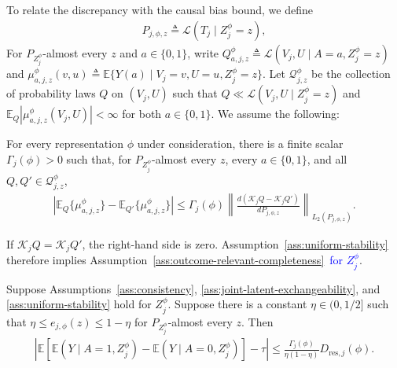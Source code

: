 To relate the discrepancy with the causal bias bound, we define
\begin{align}
	P_{j,\phi,z}\triangleq\mathcal L(T_j\mid Z_j^\phi=z),
	\label{eq:reference-held-out-law}
\end{align}
For $P_{Z_j^\phi}$-almost every $z$ and $a\in\{0,1\}$, write
$Q_{a,j,z}^\phi\triangleq\mathcal L(V_j,U\mid A=a,Z_j^\phi=z)$ and
$\mu_{a,j,z}^\phi(v,u)\triangleq\mathbb E\{Y(a)\mid V_j=v,U=u,Z_j^\phi=z\}$.
Let $\mathcal Q_{j,z}^\phi$ be the collection of probability laws $Q$ on $(V_j,U)$ such that
$Q\ll\mathcal L(V_j,U\mid Z_j^\phi=z)$ and
$\mathbb E_Q|\mu_{a,j,z}^\phi(V_j,U)|<\infty$ for both $a\in\{0,1\}$.
We assume the following:
\begin{assumption}
	\label{ass:uniform-stability}
\normalfont
	For every representation $\phi$ under consideration,
	there is a finite scalar $\Gamma_j(\phi)>0$
	such that, for $P_{Z_j^\phi}$-almost every $z$, every $a\in\{0,1\}$, and all $Q,Q'\in\mathcal Q_{j,z}^{\phi}$,
	\begin{align}
	\left|\mathbb E_Q\{\mu_{a,j,z}^{\phi}\}
	-
	\mathbb E_{Q'}\{\mu_{a,j,z}^{\phi}\}\right|
	\le
	\Gamma_j(\phi)
		\left\|
		\frac{d(\mathcal K_jQ-\mathcal K_jQ')}{dP_{j,\phi,z}}
		\right\|_{L_2(P_{j,\phi,z})}.
	\label{eq:uniform-stability}
\end{align}
\end{assumption}

If $\mathcal K_jQ=\mathcal K_jQ'$, the right-hand side is zero. Assumption~\ref{ass:uniform-stability} therefore implies Assumption~\ref{ass:outcome-relevant-completeness}\textcolor{blue}{\ for $Z_j^\phi$}.
\begin{theorem}
\label{thm:approximate-proxy-bias-bound}
\normalfont
	Suppose Assumptions~\ref{ass:consistency}, \ref{ass:joint-latent-exchangeability}, and \ref{ass:uniform-stability} hold for $Z_j^\phi$.
	Suppose there is a constant $\eta\in(0,1/2]$ such that $\eta\le e_{j,\phi}(z)\le1-\eta$ for $P_{Z_j^\phi}$-almost every $z$. Then
	\begin{align}
		\left|
		\mathbb E\!\left[
		\mathbb E(Y\mid A=1,Z_j^\phi)
		-
		\mathbb E(Y\mid A=0,Z_j^\phi)
		\right]
		-\tau
		\right|
		\le
		\frac{\Gamma_j(\phi)}{\eta(1-\eta)}
		D_{\mathrm{res},j}(\phi).
		\label{eq:uniform-approximate-proxy-bias-bound}
	\end{align}
\end{theorem}

